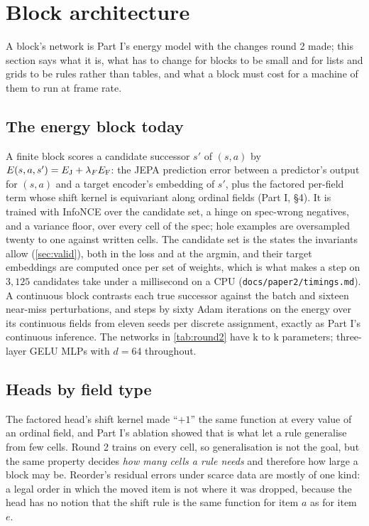 \section{Block architecture}
\label{sec:arch}

A block's network is Part I's energy model with the changes round 2 made; this section says what it is, what
has to change for blocks to be small and for lists and grids to be rules rather than tables, and what a block
must cost for a machine of them to run at frame rate.

\subsection{The energy block today}
\label{sec:energyblock}

A finite block scores a candidate successor $s'$ of $(s,a)$ by $E(s,a,s')=E_{\mathrm{J}}+\lambda_FE_{\mathrm{F}}$: the JEPA
prediction error between a predictor's output for $(s,a)$ and a target encoder's embedding of $s'$, plus the
factored per-field term whose shift kernel is equivariant along ordinal fields (Part I, \S4). It is trained
with InfoNCE over the candidate set, a hinge on spec-wrong negatives, and a variance floor, over every cell of
the spec; hole examples are oversampled twenty to one against written cells. The candidate set is the states
the invariants allow (\cref{sec:valid}), both in the loss and at the argmin, and their target embeddings are
computed once per set of weights, which is what makes a step on $3{,}125$ candidates take under a millisecond
on a CPU (\texttt{docs/paper2/timings.md}). A continuous block contrasts each true successor against the batch and sixteen near-miss perturbations,
and steps by sixty Adam iterations on the energy over its continuous fields from eleven seeds per discrete
assignment, exactly as Part I's continuous inference. The networks in \cref{tab:round2} have \minParamsK k to \maxParamsK k
parameters; three-layer GELU MLPs with $d=64$ throughout.

\subsection{Heads by field type}
\label{sec:heads}

The factored head's shift kernel made ``$+1$'' the same function at every value of an ordinal field, and Part
I's ablation showed that is what let a rule generalise from few cells. Round 2 trains on every cell, so
generalisation is not the goal, but the same property decides \emph{how many cells a rule needs} and therefore
how large a block may be. Reorder's residual errors under scarce data are mostly of one kind: a legal order in
which the moved item is not where it was dropped, because the head has no notion that the shift rule is the
same function for item $a$ as for item $e$.

